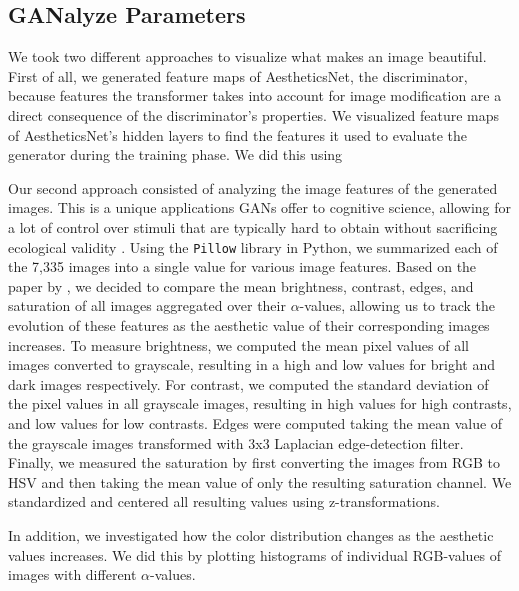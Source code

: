 \documentclass[../main.tex]{subfiles}
\begin{document}
	
	
	\subsection{GANalyze Parameters}
	We took two different approaches to visualize what makes an image beautiful. First of all, we generated feature maps of AestheticsNet, the discriminator, because features the transformer takes into account for image modification are a direct consequence of the discriminator's properties. We visualized feature maps of AestheticsNet's hidden layers to find the features it used to evaluate the generator during the training phase. We did this using 
	
	Our second approach consisted of analyzing the image features of the generated images. This is a unique applications GANs offer to cognitive science, allowing for a lot of control over stimuli that are typically hard to obtain without sacrificing ecological validity \parencite{goetschalckx2021generative}. Using the \texttt{Pillow} library \parencite{clark2015pillow} in Python, we summarized each of the 7,335 images into a single value for various image features. Based on the paper by \textcite{ke2006design}, we decided to compare the mean brightness, contrast, edges, and saturation of all images aggregated over their $\alpha$-values, allowing us to track the evolution of these features as the aesthetic value of their corresponding images increases. To measure brightness, we computed the mean pixel values of all  images converted to grayscale, resulting in a high and low values for bright and dark images respectively. For contrast, we computed the standard deviation of the pixel values in all grayscale images, resulting in high values for high contrasts, and low values for low contrasts. Edges were computed taking the mean value of the grayscale images transformed with 3x3 Laplacian edge-detection filter. Finally, we measured the saturation by first converting the images from RGB to HSV and then taking the mean value of only the resulting saturation channel. We standardized and centered all resulting values using z-transformations.
	
	In addition, we investigated how the color distribution changes as the aesthetic values increases. We did this by plotting histograms of individual RGB-values of images with different $\alpha$-values.
\end{document}
